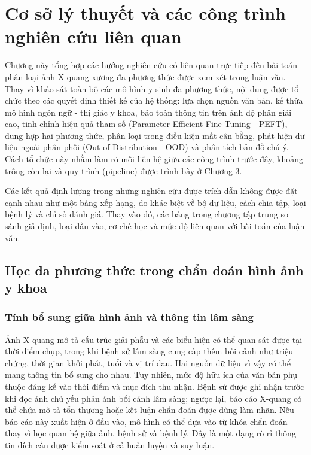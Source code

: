 \chapter{Cơ sở lý thuyết và các công trình nghiên cứu liên quan}
\label{Chapter2}

Chương này tổng hợp các hướng nghiên cứu có liên quan trực tiếp đến bài toán phân loại ảnh X-quang xương đa phương thức được xem xét trong luận văn. Thay vì khảo sát toàn bộ các mô hình y sinh đa phương thức, nội dung được tổ chức theo các quyết định thiết kế của hệ thống: lựa chọn nguồn văn bản, kế thừa mô hình ngôn ngữ - thị giác y khoa, bảo toàn thông tin trên ảnh độ phân giải cao, tinh chỉnh hiệu quả tham số (Parameter-Efficient Fine-Tuning - PEFT), dung hợp hai phương thức, phân loại trong điều kiện mất cân bằng, phát hiện dữ liệu ngoài phân phối (Out-of-Distribution - OOD) và phân tích bản đồ chú ý. Cách tổ chức này nhằm làm rõ mối liên hệ giữa các công trình trước đây, khoảng trống còn lại và quy trình (pipeline) được trình bày ở Chương 3.

Các kết quả định lượng trong những nghiên cứu được trích dẫn không được đặt cạnh nhau như một bảng xếp hạng, do khác biệt về bộ dữ liệu, cách chia tập, loại bệnh lý và chỉ số đánh giá. Thay vào đó, các bảng trong chương tập trung so sánh giả định, loại đầu vào, cơ chế học và mức độ liên quan với bài toán của luận văn.

\section{Học đa phương thức trong chẩn đoán hình ảnh y khoa}

\subsection{Tính bổ sung giữa hình ảnh và thông tin lâm sàng}

Ảnh X-quang mô tả cấu trúc giải phẫu và các biểu hiện có thể quan sát được tại thời điểm chụp, trong khi bệnh sử lâm sàng cung cấp thêm bối cảnh như triệu chứng, thời gian khởi phát, tuổi và vị trí đau. Hai nguồn dữ liệu vì vậy có thể mang thông tin bổ sung cho nhau. Tuy nhiên, mức độ hữu ích của văn bản phụ thuộc đáng kể vào thời điểm và mục đích thu nhận. Bệnh sử được ghi nhận trước khi đọc ảnh chủ yếu phản ánh bối cảnh lâm sàng; ngược lại, báo cáo X-quang có thể chứa mô tả tổn thương hoặc kết luận chẩn đoán được dùng làm nhãn. Nếu báo cáo này xuất hiện ở đầu vào, mô hình có thể dựa vào từ khóa chẩn đoán thay vì học quan hệ giữa ảnh, bệnh sử và bệnh lý. Đây là một dạng rò rỉ thông tin đích cần được kiểm soát ở cả huấn luyện và suy luận.

